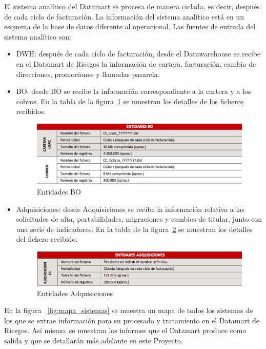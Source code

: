 \documentclass[a4paper, 12pt]{book}
\begin{document}
El sistema analítico del Datamart se procesa de manera ciclada, es decir, después de cada ciclo de facturación. La información del sistema analítico está en un esquema de la base de datos diferente al operacional. Las fuentes de entrada del sistema analítico son:
\begin{itemize}
	\item DWH: después de cada ciclo de facturación, desde el Datawarehouse se recibe en el Datamart de Riesgos la información de cartera, facturación, cambio de direcciones, promociones y llamadas pasarela.
	\item BO: desde BO se recibe la información correspondiente a la cartera y a los cobros. En la tabla de la figura~\ref{fig:entidades12} se muestran los detalles de los ficheros recibidos.

	\begin{figure}
	  \centering
	  \includegraphics[width=14cm, keepaspectratio]{img/entidades12}
	  \caption{Entidades BO}
	  \label{fig:entidades12}
	\end{figure}
	
	\item Adquisiciones: desde Adquisiciones se recibe la información relativa a las solicitudes de alta, portabilidades, migraciones y cambios de titular, junto con una serie de indicadores. En la tabla de la figura~\ref{fig:entidades13} se muestran los detalles del fichero recibido.

	\begin{figure}
	  \centering
	  \includegraphics[width=14cm, keepaspectratio]{img/entidades13}
	  \caption{Entidades Adquisiciones}
	  \label{fig:entidades13}
	\end{figure}
\end{itemize}

En la figura ~\ref{fig:mapa_sistemas} se muestra un mapa de todos los sistemas de los que se extrae información para su procesado y tratamiento en el Datamart de Riesgos. Así mismo, se muestran los informes que el Datamart produce como salida y que se detallarán más adelante en este Proyecto.
\end{document}
